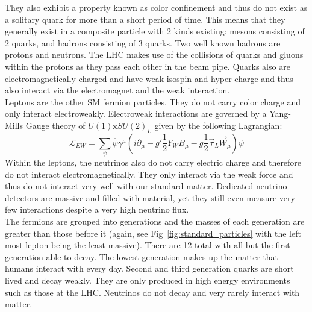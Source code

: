 They also exhibit a property known as color confinement and thus do not exist as a solitary quark for more than a short period of time. This means that they generally exist in a composite particle with 2 kinds existing: mesons consisting of 2 quarks, and hadrons consisting of 3 quarks. Two well known hadrons are protons and neutrons. The LHC makes use of the collisions of quarks and gluons within the protons as they pass each other in the beam pipe. Quarks also are electromagnetically charged and have weak isospin and hyper charge and thus also interact via the electromagnet and the weak interaction.\\

Leptons are the other SM fermion particles. They do not carry color charge and only interact electroweakly. Electroweak interactions are governed by a Yang-Mills Gauge theory of $U(1)\mathrm{x}SU(2)_L$ given by the following Lagrangian:
\begin{equation}
\mathcal{L}_{EW}=\displaystyle\sum_{\psi} \overline{\psi}\gamma^\mu ( i\partial_\mu - g' \frac{1}{2} Y_W B_\mu - g\frac{1}{2} \vec{\tau}_L\vec{W}_\mu)\psi
\end{equation}
Within the leptons, the neutrinos also do not carry electric charge and therefore do not interact electromagnetically. They only interact via the weak force and thus do not interact very well with our standard matter. Dedicated neutrino detectors are massive and filled with material, yet they still even measure very few interactions despite a very high neutrino flux.\\

The fermions are grouped into generations and the masses of each generation are greater than those before it (again, see Fig~\ref{fig:standard_particles} with the left most lepton being the least massive). There are 12 total with all but the first generation able to decay. The lowest generation makes up the matter that humans interact with every day. Second and third generation quarks are short lived and decay weakly. They are only produced in high energy environments such as those at the LHC. Neutrinos do not decay and very rarely interact with matter.\\



